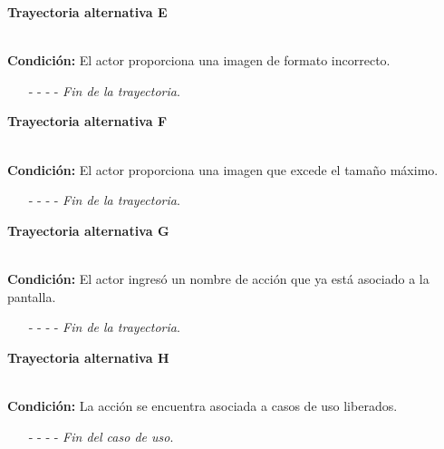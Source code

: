 \hypertarget{CU11-1-2:TAE}{\textbf{Trayectoria alternativa E}}\\
\noindent \textbf{Condición:} El actor proporciona una imagen de formato incorrecto.
\begin{enumerate}
	\UCpaso[\UCsist] Muestra el mensaje  señalando el campo que presenta el error en la pantalla .
	\UCpaso Regresa al paso \ref{CU11.1.2-P4} de la trayectoria principal.
	\item[- -] - - {\em {Fin de la trayectoria}}.
\end{enumerate}
\hypertarget{CU11-1-2:TAF}{\textbf{Trayectoria alternativa F}}\\
\noindent \textbf{Condición:} El actor proporciona una imagen que excede el tamaño máximo.
\begin{enumerate}
	\UCpaso[\UCsist] Muestra el mensaje  señalando el campo que presenta el error en la pantalla .
	\UCpaso Regresa al paso \ref{CU11.1.2-P4} de la trayectoria principal.
	\item[- -] - - {\em {Fin de la trayectoria}}.
\end{enumerate}
\hypertarget{CU11-1-2:TAG}{\textbf{Trayectoria alternativa G}}\\
\noindent \textbf{Condición:} El actor ingresó un nombre de acción que ya está asociado a la pantalla.
\begin{enumerate}
	\UCpaso[\UCsist] Muestra el mensaje  señalando el campo que presenta la duplicidad en la pantalla .
	\UCpaso Regresa al paso \ref{CU11.1.2-P4} de la trayectoria principal.
	\item[- -] - - {\em {Fin de la trayectoria}}.
\end{enumerate}
\hypertarget{CU11-1-2:TAH}{\textbf{Trayectoria alternativa H}}\\
\noindent \textbf{Condición:} La acción se encuentra asociada a casos de uso liberados.
\begin{enumerate}
	\UCpaso[\UCsist] Oculta el botón \editar de la acción que esta asociada a casos de uso liberados.
	\item[- -] - - {\em {Fin del caso de uso}}.
\end{enumerate}